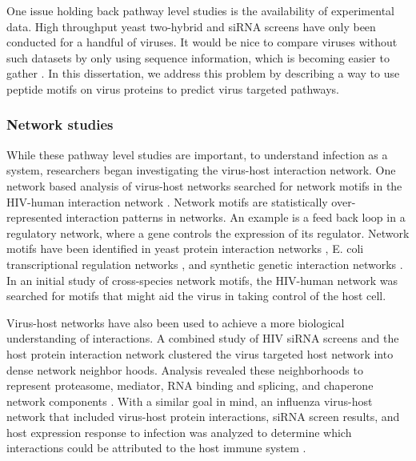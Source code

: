 One issue holding back pathway level studies is the availability of
experimental data. High throughput yeast two-hybrid and siRNA screens
have only been conducted for a handful of viruses. It would be nice to
compare viruses without such datasets by only using sequence
information, which is becoming easier to gather
\cite{munroe2010third}. In this dissertation, we address this problem
by describing a way to use peptide motifs on virus proteins to predict
virus targeted pathways.


\subsubsection{Network studies}

While these pathway level studies are important, to understand
infection as a system, researchers began investigating the virus-host
interaction network. One network based analysis of virus-host networks
searched for network motifs in the HIV-human interaction network
\cite{hivNetMotifs}. Network motifs are statistically over-represented
interaction patterns in networks. An example is a feed back loop in a
regulatory network, where a gene controls the expression of its
regulator. Network motifs have been identified in yeast protein
interaction networks \cite{wuchty2003evolutionary}, E. coli
transcriptional regulation networks \cite{shen2002network}, and
synthetic genetic interaction networks \cite{costanzo2010genetic}. In
an initial study of cross-species network motifs, the HIV-human
network was searched for motifs that might aid the virus in taking
control of the host cell.

Virus-host networks have also been used to achieve a more biological
understanding of interactions. A combined study of HIV siRNA screens
and the host protein interaction network clustered the virus targeted
host network into dense network neighbor hoods. Analysis revealed
these neighborhoods to represent proteasome, mediator, RNA binding and
splicing, and chaperone network components \cite{bushman09}. With a
similar goal in mind, an influenza virus-host network that included
virus-host protein interactions, siRNA screen results, and host
expression response to infection was analyzed to determine which
interactions could be attributed to the host immune system
\cite{shapira2009physical}.

